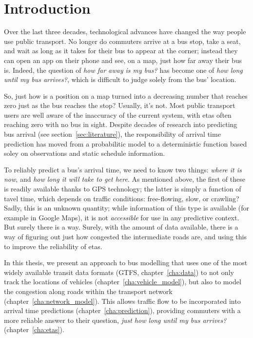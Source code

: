 
\chapter{Introduction}
\label{cha:intro}



\pagebreak
Over the last three decades, technological advances have changed the way people use public transport.
No longer do commuters arrive at a bus stop, take a seat,
and wait as long as it takes for their bus to appear at the corner;
instead they can open an app on their phone and see, on a map,
just how far away their bus is.
Indeed, the question of \emph{how far away is my bus?}
has become one of \emph{how long until my bus arrives?},
which is difficult to judge solely from the bus' location.


So, just how is a position on a map turned into a
decreasing number that reaches zero just as the bus reaches the stop?
Usually, it's not.
Most public transport users are well aware of the inaccuracy of the current system,
with \glspl{eta} often reaching zero with no bus in sight.
Despite decades of research into predicting bus arrival (see section~\ref{sec:literature}),
the responsibility of arrival time prediction has moved from a probabilitic model
to a deterministic function based soley on observations and static schedule information.


To reliably predict a bus's arrival time,
we need to know two things:
\emph{where it is now}, and \emph{how long it will take to get here}.
As mentioned above, the first of these is readily available thanks to  GPS technology;
the latter is simply a function of tavel time,
which depends on traffic conditions: free-flowing, slow, or crawling?
Sadly, this is an unknown quantity;
while information of this type is available (for example in Google Maps),
it is not \emph{accessible} for use in any predictive context.
But surely there is a way.
Surely, with the amount of data available, there is a way of figuring out
just how congested the intermediate roads are,
and using this to improve the reliability of \glspl{eta}.


In this thesis, we present an approach to bus modelling that
uses one of the most widely available transit data formats
(GTFS, chapter~\ref{cha:data})
to not only track the \rt{} locations of vehicles
(chapter~\ref{cha:vehicle_model}),
but also to model the congestion along roads within the transport network
(chapter~\ref{cha:network_model}).
This allows traffic flow to be incorporated into arrival time predictions
(chapter~\ref{cha:prediction}),
providing commuters with a more reliable answer to their question,
\emph{just how long until my bus arrives?}
(chapter~\ref{cha:etas}).



